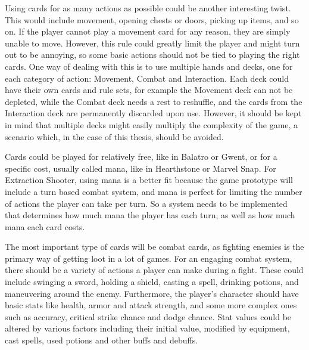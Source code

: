 Using cards for as many actions as possible could be another interesting twist. This would include movement, opening chests or doors, picking up items, and so on. If the player cannot play a movement card for any reason, they are simply unable to move. However, this rule could greatly limit the player and might turn out to be annoying, so some basic actions should not be tied to playing the right cards. One way of dealing with this is to use multiple hands and decks, one for each category of action: Movement, Combat and Interaction. Each deck could have their own cards and rule sets, for example the Movement deck can not be depleted, while the Combat deck needs a rest to reshuffle, and the cards from the Interaction deck are permanently discarded upon use. However, it should be kept in mind that multiple decks might easily multiply the complexity of the game, a scenario which, in the case of this thesis, should be avoided.

Cards could be played for relatively free, like in Balatro\cite{balatro2024} or Gwent\cite{gwent2018}, or for a specific cost, usually called mana, like in Hearthstone\cite{hearthstone2014} or Marvel Snap\cite{marvelSnap2022}. For Extraction Shooter, using mana is a better fit because the game prototype will include a turn based combat system, and mana is perfect for limiting the number of actions the player can take per turn. So a system needs to be implemented that determines how much mana the player has each turn, as well as how much mana each card costs.

The most important type of cards will be combat cards, as fighting enemies is the primary way of getting loot in a lot of games. For an engaging combat system, there should be a variety of actions a player can make during a fight. These could include swinging a sword, holding a shield, casting a spell, drinking potions, and maneuvering around the enemy. Furthermore, the player's character should have basic stats like health, armor and attack strength, and some more complex ones such as accuracy, critical strike chance and dodge chance. Stat values could be altered by various factors including their initial value, modified by equipment, cast spells, used potions and other buffs and debuffs.